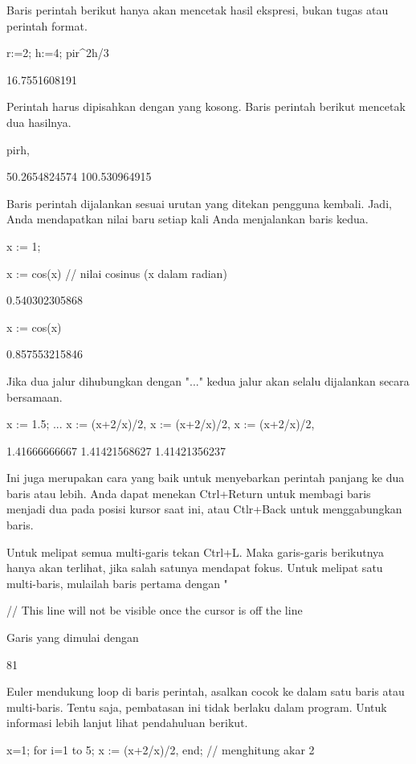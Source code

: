 \documentclass{article}
\begin{document}
Baris perintah berikut hanya akan mencetak hasil ekspresi, bukan tugas
atau perintah format.


\>r:=2; h:=4; pi\*r^2\*h/3


    16.7551608191

Perintah harus dipisahkan dengan yang kosong. Baris perintah berikut
mencetak dua hasilnya.


\>pi\*r\*h, %


    50.2654824574
    100.530964915

Baris perintah dijalankan sesuai urutan yang ditekan pengguna kembali.
Jadi, Anda mendapatkan nilai baru setiap kali Anda menjalankan baris
kedua.


\>x := 1;

\>x := cos(x) // nilai cosinus (x dalam radian)


    0.540302305868

\>x := cos(x)


    0.857553215846

Jika dua jalur dihubungkan dengan "..." kedua jalur akan selalu
dijalankan secara bersamaan.


\>x := 1.5; ...  
\>   x := (x+2/x)/2, x := (x+2/x)/2, x := (x+2/x)/2, 


    1.41666666667
    1.41421568627
    1.41421356237

Ini juga merupakan cara yang baik untuk menyebarkan perintah panjang
ke dua baris atau lebih. Anda dapat menekan Ctrl+Return untuk membagi
baris menjadi dua pada posisi kursor saat ini, atau Ctlr+Back untuk
menggabungkan baris.


Untuk melipat semua multi-garis tekan Ctrl+L. Maka garis-garis
berikutnya hanya akan terlihat, jika salah satunya mendapat fokus.
Untuk melipat satu multi-baris, mulailah baris pertama dengan "%


\>%
\>    // This line will not be visible once the cursor is off the line


Garis yang dimulai dengan %


    81

Euler mendukung loop di baris perintah, asalkan cocok ke dalam satu
baris atau multi-baris. Tentu saja, pembatasan ini tidak berlaku dalam
program. Untuk informasi lebih lanjut lihat pendahuluan berikut.


\>x=1; for i=1 to 5; x := (x+2/x)/2, end; // menghitung akar 2
\end{document}
